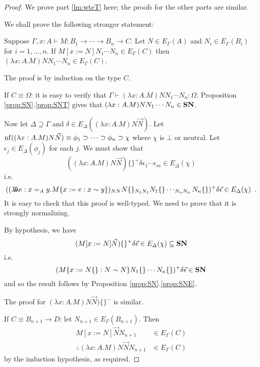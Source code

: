\begin{proof}
We prove part \ref{lm:wteT} here; the proofs for the other parts are similar.

We shall prove the following stronger statement:

Suppose $\Gamma, x : A \vdash M : B_1 \rightarrow \cdots \rightarrow B_n \rightarrow C$.  Let $N \in E_\Gamma(A)$ and $N_i \in E_\Gamma(B_i)$ for $i = 1, \ldots, n$.  If
$M[x:=N]N_1 \cdots N_n \in E_\Gamma(C)$ then $(\lambda x:A.M)NN_1 \cdots N_n \in E_\Gamma(C)$.

The proof is by induction on the type $C$.

If $C \equiv \Omega$: it is easy to verify that $\Gamma \vdash (\lambda x:A.M)NN_1 \cdots N_n : \Omega$.  Proposition \ref{prop:SN}.\ref{prop:SNT}
gives that $(\lambda x:A.M)NN_1 \cdots N_n \in \mathbf{SN}$.

Now let $\Delta \supseteq \Gamma$ and $\delta \in E_\Delta((\lambda x:A.M)N \vec{N})$.  Let $\mathrm{nf} ( {(\lambda x:A.M)N \vec{N}} ) \equiv \phi_1 \supset \cdots \supset \phi_n \supset \chi$ where $\chi$ is $\bot$ or neutral.  Let $\epsilon_j \in E_\Delta(\phi_j)$ for each $j$.  We must show that
\[ ((\lambda x:A.M)N \vec{N})\{\}^+ \delta \epsilon_1 \cdots \epsilon_m
\in E_\Delta(\chi) \]
i.e.
\[ ((\lambda \!\! \lambda \!\! \lambda e:x =_A y. M \{ x:=e : x \sim y \})_{NN} N\{\}_{N_1 N_1}
N_1\{\} \cdots_{N_n N_n} N_n\{\})^+ \delta \vec{\epsilon} \in E_\Delta(\chi) \enspace . \]
It is easy to check that this proof is well-typed.  We need to prove that it is strongly normalizing.

By hypothesis, we have
\[ (M[x:=N] \vec{N})\{\}^+ \delta \vec{\epsilon} \in E_\Delta(\chi) \subseteq \mathbf{SN} \]
i.e.
\[ (M\{x:=N\{\} : N \sim N\} N_1 \{\} \cdots N_n \{\})^+ \delta \vec{\epsilon}
\in \mathbf{SN} \]
and so the result follows by Proposition \ref{prop:SN}.\ref{prop:SNE}.

The proof for $(\lambda x:A.M)N \vec{N})\{\}^-$ is similar.

If $C \equiv B_{n+1} \rightarrow D$: let $N_{n+1} \in E_{\Gamma}(B_{n+1})$.  Then
\begin{align*}
M[x:=N]\vec{N} N_{n+1} & \in E_\Gamma(C) \\
\therefore (\lambda x:A.M)N \vec{N} N_{n+1} & \in E_\Gamma(C)
\end{align*}
by the induction hypothesis, as required.


\end{proof}
